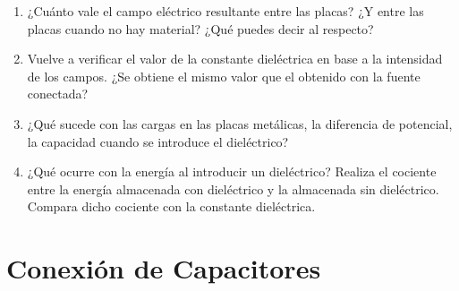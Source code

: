 \documentclass[12pt]{report}
\begin{document}
\begin{enumerate}
    \begin{enumerate}
        \item ¿Cuánto vale el campo eléctrico resultante entre las placas? ¿Y entre las placas cuando no hay material? ¿Qué puedes decir al respecto?
        \item Vuelve a verificar el valor de la constante dieléctrica en base a la intensidad de los campos. ¿Se obtiene el mismo valor que el obtenido con la fuente conectada?
        \item ¿Qué sucede con las cargas en las placas metálicas, la diferencia de potencial, la capacidad cuando se introduce el dieléctrico?
        \item ¿Qué ocurre con la energía al introducir un dieléctrico? Realiza el cociente entre la energía almacenada con dieléctrico y la almacenada sin dieléctrico. Compara dicho cociente con la constante dieléctrica.
    \end{enumerate}
\end{enumerate}

\section{Conexión de Capacitores}
\end{document}
